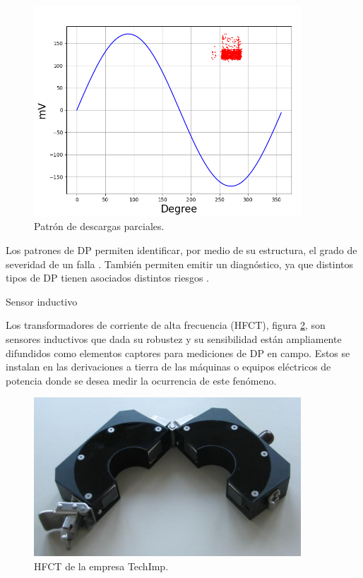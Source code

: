 \begin{figure}[!ht]
	\centering
	\includegraphics[width=100mm]{./Figures/patronEjemplo.png}
	\caption{Patrón de descargas parciales.}
	\label{fig:patronEjemplo}
\end{figure}

Los patrones de DP permiten identificar, por medio de su estructura, el grado de severidad de un falla \citep{Gulski:citation}. También permiten emitir un diagnóstico, ya que distintos tipos de DP tienen asociados distintos riesgos \citep{Cavallini:citation}.

Sensor inductivo

Los transformadores de corriente de alta frecuencia (HFCT), figura \ref{fig:hfct}, son sensores inductivos que dada su robustez y su sensibilidad están ampliamente difundidos como elementos captores para mediciones de DP en campo. Estos se instalan en las derivaciones a tierra de las máquinas o equipos eléctricos de potencia donde se desea medir la ocurrencia de este fenómeno.


\begin{figure}[ht]
	\centering
	\includegraphics[width=100mm]{./Figures/hfct1.png}
	\caption{HFCT de la empresa TechImp.}
	\label{fig:hfct}
\end{figure}


